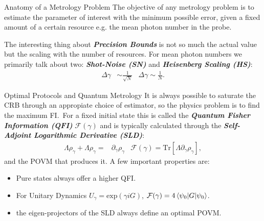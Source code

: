 \documentclass[final]{beamer}
\newlength{\colwidth}
\begin{document}
\begin{frame}[t]
\begin{columns}[t]
\begin{column}{\colwidth}
 \begin{block}{Anatomy of a Metrology Problem}
   The objective of any metrology problem is to estimate the parameter of interest with the minimum possible error, given a fixed amount of a
   certain resource e.g. the mean photon number in the probe.
   \vspace{-0.07\linewidth}
   
   \vspace{-0.11\linewidth}
   The interesting thing about  \textbf{\textit{Precision Bounds}} is not so much the actual value but the scaling with the number of resources.
   For mean photon numbers we primarily talk about two: \textbf{\textit{Shot-Noise (SN)}} and \textbf{\textit{Heisenberg Scaling (HS)}}:
 {\Large
  \begin{align*}
    \Delta \gamma &\sim \frac{1}{\sqrt{N}} & \Delta \gamma \sim \frac{1}{N}.
  \end{align*}
}
 \end{block}
\begin{block}{Optimal Protocols and Quantum Metrology}
  It is always possible to saturate the CRB through an appropiate choice of estimator, so the physics problem is to find the maximum
  FI.\ For a fixed initial state this is called the \textit{\textbf{Quantum Fisher Information (QFI)}} $\mathcal{F}(\gamma)$
  and is typically calculated through the \textit{\textbf{Self-Adjoint Logarithmic Derivative (SLD)}}:
  {\Large
  \begin{align*}
    \Lambda \rho_{\gamma} + \Lambda \rho_{\gamma} =& \partial_{\gamma} \rho_{\gamma} & \mathcal{F}(\gamma) = \mathrm{Tr}[\Lambda \partial_{\gamma}\rho_{\gamma}],
  \end{align*}
}
and the POVM that produces it. A few important properties are:
\begin{itemize}
        \item Pure states always offer a higher QFI.
        \item For Unitary Dynamics $U_{\gamma}=\mathrm{exp}({\gamma iG})$, $\mathcal{F}(\gamma)=4\braket{\psi_{0} | G | \psi_{0}}$.
        \item the eigen-projectors of the SLD always define an optimal POVM.
\end{itemize}
\end{block}



\end{column}
\end{columns}
\end{frame}
\end{document}
